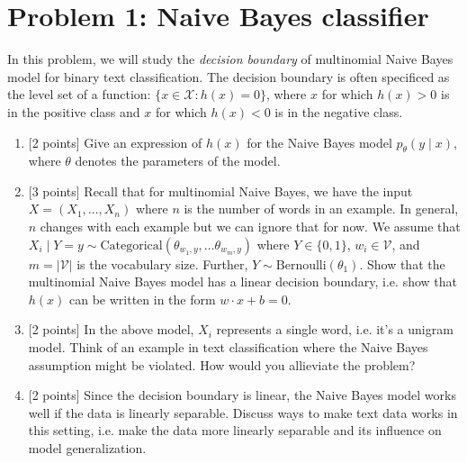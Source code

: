 \documentclass{article}
\theoremstyle{case}
\theoremstyle{definition}
\newcommand{\recall}[1]{\noindent{[\textbf{RECALL:} #1]}}
\begin{document}
\section*{Problem 1: Naive Bayes classifier}
In this problem, we will study the \emph{decision boundary} of multinomial Naive Bayes model for binary text classification.
The decision boundary is often specificed as the level set of a function:
$\{x\in\mathcal{X} : h(x) = 0\}$,
where $x$ for which $h(x) > 0$ is in the positive class and
$x$ for which $h(x) < 0$ is in the negative class.

\begin{enumerate}
    \item {[2 points]} Give an expression of $h(x)$ for the Naive Bayes model $p_\theta(y\mid x)$, where $\theta$ denotes the parameters of the model.

    \newpage
\item {[3 points]} Recall that for multinomial Naive Bayes,
        we have the input $X=(X_1, \ldots, X_n)$ where $n$ is the number of words in an example.
        In general, $n$ changes with each example but we can ignore that for now.
        We assume that $X_i\mid Y=y \sim \text{Categorical}(\theta_{w_1,y}, \ldots \theta_{w_m,y})$ where $Y\in \{0, 1\}$, $w_i\in\mathcal{V}$, and $m=|\mathcal{V}|$ is the vocabulary size.
        Further, $Y\sim\text{Bernoulli}(\theta_1)$.
        Show that the multinomial Naive Bayes model has a linear decision boundary,
        i.e. show that $h(x)$ can be written in the form $w\cdot x + b=0$.
        \recall{
            The categorical distribution is a multinomial distribution with one trial.
            Its PMF is
            $$
            p(x_1,\ldots, x_m) = \prod_{i=1}^m\theta_{i}^{x_i} \;,
            $$
            where $x_i = \mathbbm{1}[x=i]$, $\sum_{i=1}^m x_i = 1$,
            and $\sum_{i=1}^m \theta_i = 1$.
        }
    
    \newpage
\item {[2 points]} In the above model, $X_i$ represents a single word, i.e. it's a unigram model.
    Think of an example in text classification where the Naive Bayes assumption might be violated.
    How would you allieviate the problem?

    \newpage
\item {[2 points]} Since the decision boundary is linear, the Naive Bayes model works well if the data is linearly separable.
        Discuss ways to make text data works in this setting, i.e. make the data
        more linearly separable and its influence on model generalization.

\newpage
\end{enumerate}
\end{document}
